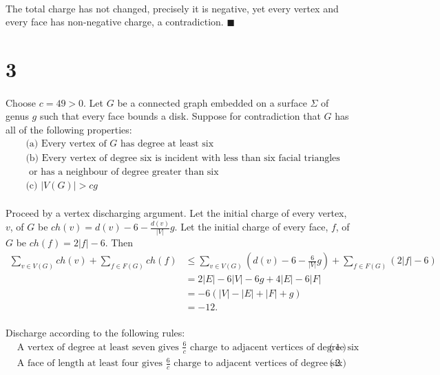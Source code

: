 \documentclass[letterpaper,12pt,oneside,onecolumn]{report}
\begin{document}
\paragraph{}
The total charge has not changed, precisely it is negative, yet every vertex and every face has non-negative charge, a contradiction. $\blacksquare$

\section*{3}
\paragraph{}
Choose $c = 49 > 0$. Let $G$ be a connected graph embedded on a surface $\Sigma$ of genus $g$ such that every face bounds a disk. Suppose for contradiction that $G$ has all of the following properties:
\begin{align*}
&\text{(a) Every vertex of $G$ has degree at least six}\\
&\text{(b) Every vertex of degree six is incident with less than six facial triangles}\\
&\text{   or has a neighbour of degree greater than six} \\
&\text{(c) } |V(G)| > cg 
\end{align*}
\paragraph{}
Proceed by a vertex discharging argument. Let the initial charge of every vertex, $v$, of $G$ be $ch(v) = d(v) - 6 - \frac{d(v)}{|V|}g$. Let the initial charge of every face, $f$, of $G$ be $ch(f) = 2|f| - 6$. Then
\begin{align*}
\sum_{v \in V(G)} ch(v) + \sum_{f \in F(G)} ch(f) &\leq \sum_{v \in V(G)} (d(v) - 6 -\frac{6}{|V|}g) + \sum_{f \in F(G)} (2|f| - 6) \\ &= 2|E| - 6|V| - 6g + 4|E| - 6|F| \\ &= -6(|V| - |E| + |F| + g) \\ &= -12. 
\end{align*}
\paragraph{}
Discharge according to the following rules:
\begin{align*}
&\text{A vertex of degree at least seven gives $\frac{6}{c}$ charge to adjacent vertices of degree six} &(1)\\
&\text{A face of length at least four gives $\frac{6}{c}$ charge to adjacent vertices of degree six} &(2)
\end{align*}
\end{document}
